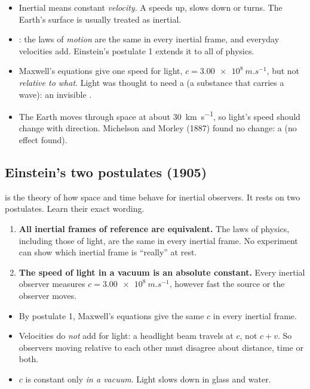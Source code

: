 \begin{itemize}
  \item Inertial means constant \emph{velocity}. A  speeds up, slows
        down or turns. The Earth's surface is usually treated as inertial.
  \item {}: the laws of \emph{motion} are the same in every inertial
        frame, and everyday velocities add. Einstein's postulate 1 extends it to all of physics.
  \item Maxwell's equations give one speed for light, $c = \qty{3.00e8}{m.s^{-1}}$, but not
        \emph{relative to what}. Light was thought to need a  (a substance that
        carries a wave): an invisible .
  \item The Earth moves through space at about \qty{30}{km.s^{-1}}, so light's speed should
        change with direction. Michelson and Morley (1887) found no change: a  (no effect found).
\end{itemize}

\subsection{Einstein's two postulates (1905)}
 is the theory of how space and time behave for inertial observers.
It rests on two postulates. Learn their exact wording.
\begin{enumerate}
  \item \textbf{All inertial frames of reference are equivalent.} The laws of physics, including
        those of light, are the same in every inertial frame. No experiment can show which
        inertial frame is ``really'' at rest.
  \item \textbf{The speed of light in a vacuum is an absolute constant.} Every inertial observer
        measures $c = \qty{3.00e8}{m.s^{-1}}$, however fast the source or the observer moves.
\end{enumerate}
\begin{itemize}
  \item By postulate 1, Maxwell's equations give the same $c$ in every inertial frame.
  \item Velocities do \emph{not} add for light: a headlight beam travels at $c$, not $c + v$. So
        observers moving relative to each other must disagree about distance, time or both.
  \item $c$ is constant only \emph{in a vacuum}. Light slows down in glass and water.
\end{itemize}


